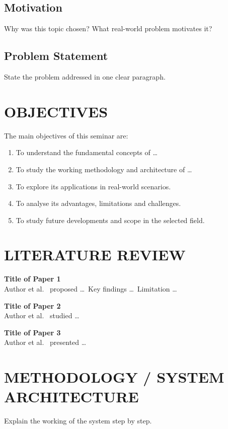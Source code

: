 \documentclass[12pt,a4paper]{report}
\begin{document}
\section{Motivation}
Why was this topic chosen? What real-world problem motivates it?

\section{Problem Statement}
State the problem addressed in one clear paragraph.

\chapter{OBJECTIVES}
The main objectives of this seminar are:
\begin{enumerate}[leftmargin=*]
  \item To understand the fundamental concepts of \ldots
  \item To study the working methodology and architecture of \ldots
  \item To explore its applications in real-world scenarios.
  \item To analyse its advantages, limitations and challenges.
  \item To study future developments and scope in the selected field.
\end{enumerate}

\chapter{LITERATURE REVIEW}
\noindent\textbf{Title of Paper 1}\\
Author et al.\ \cite{ref1} proposed \ldots\ Key findings \ldots\ Limitation \ldots

\noindent\textbf{Title of Paper 2}\\
Author et al.\ \cite{ref2} studied \ldots

\noindent\textbf{Title of Paper 3}\\
Author et al.\ \cite{ref3} presented \ldots

\chapter{METHODOLOGY / SYSTEM ARCHITECTURE}
Explain the working of the system step by step.
\end{document}

